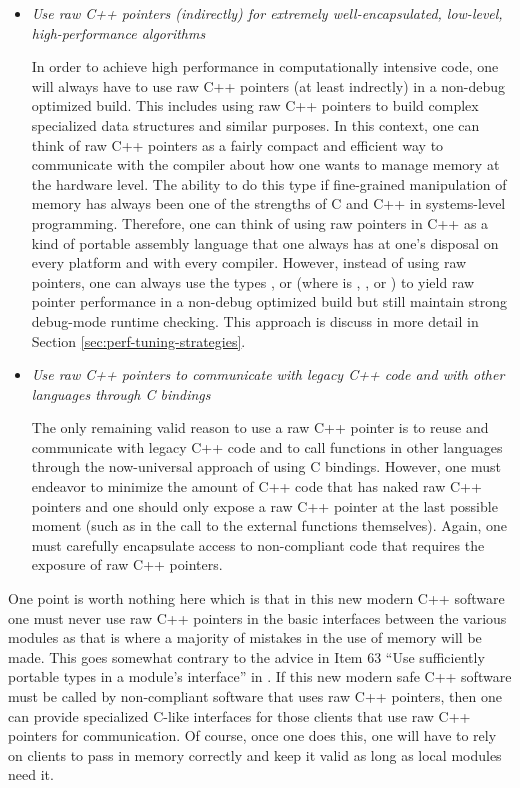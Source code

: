 \documentclass[pdf,ps2pdf,11pt]{SANDreport}
\begin{document}
\begin{itemize}

{}\item{}\textit{Use raw C++ pointers (indirectly) for extremely
well-encapsulated, low-level, high-performance algorithms}

In order to achieve high performance in computationally intensive code, one
will always have to use raw C++ pointers (at least indrectly) in a non-debug
optimized build.  This includes using raw C++ pointers to build complex
specialized data structures and similar purposes.  In this context, one can
think of raw C++ pointers as a fairly compact and efficient way to communicate
with the compiler about how one wants to manage memory at the hardware level.
The ability to do this type if fine-grained manipulation of memory has always
been one of the strengths of C and C++ in systems-level programming.
Therefore, one can think of using raw pointers in C++ as a kind of portable
assembly language that one always has at one's disposal on every platform and
with every compiler.  However, instead of using raw pointers, one can always
use the types {}, {} or {}
(where {} is {}, {}, or
{}) to yield raw pointer performance in a non-debug optimized
build but still maintain strong debug-mode runtime checking.  This approach is
discuss in more detail in Section {}\ref{sec:perf-tuning-strategies}.

{}\item{}\textit{Use raw C++ pointers to communicate with legacy C++
code and with other languages through C bindings}

The only remaining valid reason to use a raw C++ pointer is to reuse and
communicate with legacy C++ code and to call functions in other languages
through the now-universal approach of using C bindings.  However, one must
endeavor to minimize the amount of C++ code that has naked raw C++ pointers
and one should only expose a raw C++ pointer at the last possible moment (such
as in the call to the external functions themselves).  Again, one must
carefully encapsulate access to non-compliant code that requires the exposure
of raw C++ pointers.

\end{itemize}

One point is worth nothing here which is that in this new modern C++
software one must never use raw C++ pointers in the basic interfaces
between the various modules as that is where a majority of mistakes in
the use of memory will be made.  This goes somewhat contrary to the
advice in Item 63 ``Use sufficiently portable types in a module's
interface'' in {}\cite{C++CodingStandards05}.  If this new modern safe
C++ software must be called by non-compliant software that uses raw
C++ pointers, then one can provide specialized C-like interfaces for
those clients that use raw C++ pointers for communication.  Of course,
once one does this, one will have to rely on clients to pass in memory
correctly and keep it valid as long as local modules need it.
\end{document}
